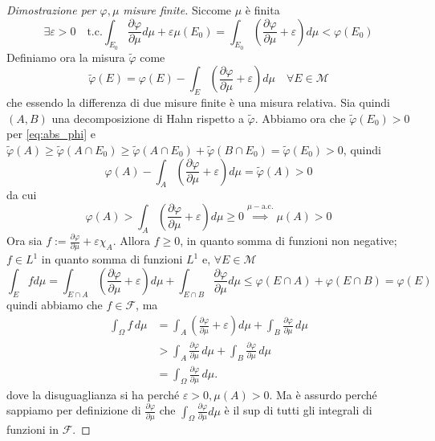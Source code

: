 \begin{proof}[Dimostrazione per \(\varphi , \mu\) misure finite]
    Siccome \(\mu\) è finita 
    \begin{equation}\label{eq:abs_phi}
        \exists \varepsilon > 0 \quad \text{t.c.} \int_{E_{0}} \frac{\partial
        \varphi }{\partial \mu} d\mu + \varepsilon \mu(E_{0}) = \int_{E_{0}}
        {\left( \frac{\partial \varphi }{\partial \mu} + \varepsilon \right)}
        d\mu < \varphi (E_{0})
    \end{equation}
    Definiamo ora la misura \(\tilde{\varphi}\) come 
    \[
        \tilde{\varphi }(E) = \varphi (E) - \int_E {\left( \frac{\partial
        \varphi }{\partial \mu} + \varepsilon \right)} d\mu \quad \forall E \in
        \mathcal{M}
    \]
    che essendo la differenza di due misure finite è una misura relativa. Sia
    quindi \((A, B)\) una decomposizione di Hahn rispetto a \(\tilde{\varphi
    }\). Abbiamo ora che \(\tilde{\varphi }(E_{0}) > 0\) per \eqref{eq:abs_phi} e
    \(\tilde{\varphi}(A) \ge \tilde{\varphi}(A \cap E_{0}) \ge \tilde{\varphi}(A
    \cap E_{0}) + \tilde{\varphi}(B \cap E_{0}) = \tilde{\varphi}(E_{0}) > 0\),
    quindi
    \[
        \varphi(A) - \int_A \left( \frac{\partial \varphi}{\partial \mu} + \varepsilon\right) d\mu = \tilde{\varphi}(A) >0  
    \]
    da cui
    \[
        \varphi (A) > \int_A {\left( \frac{\partial \varphi }{\partial \mu} +
        \varepsilon \right)} d\mu \ge 0 \overset{\mu-\text{a.c.}}{\implies } \mu(A) > 0
    \]
    Ora sia \(f := \frac{\partial \varphi }{\partial \mu} + \varepsilon
    \chi_{A}\). Allora \(f \ge 0\), in quanto somma di funzioni non negative;
    \(f \in L^{1}\) in quanto somma di funzioni \(L^{1}\) e, \(\forall E \in
    \mathcal{M}\) 
    \[
        \int_E f d\mu = \int_{E \cap A} {\left( \frac{\partial \varphi
        }{\partial \mu} + \varepsilon \right)} d\mu + \int_{E \cap B}
        \frac{\partial \varphi }{\partial \mu} d\mu \le \varphi (E \cap A) +
        \varphi (E \cap B) = \varphi (E)
    \]
    quindi abbiamo che \(f \in \mathcal{F}\), ma
    \[
        \begin{aligned}
        \int_\Omega f \, d\mu &= \int_A \left( \frac{\partial \varphi}{\partial \mu} + \varepsilon \right) d\mu + \int_B \frac{\partial \varphi}{\partial \mu} \, d\mu \\
        &> \int_A \frac{\partial \varphi}{\partial \mu} \, d\mu + \int_B \frac{\partial \varphi}{\partial \mu} \, d\mu \\
        &= \int_\Omega \frac{\partial \varphi}{\partial \mu} \, d\mu.
        \end{aligned}
    \]
    dove la disuguaglianza si ha perché \(\varepsilon > 0, \mu(A) > 0\). Ma è assurdo perché sappiamo per definizione di \(\frac{\partial \varphi
    }{\partial \mu}\) che \(\int_\Omega \frac{\partial \varphi }{\partial \mu}
    d\mu \) è il sup di tutti gli integrali di funzioni in \(\mathcal{F}\).
\end{proof}
